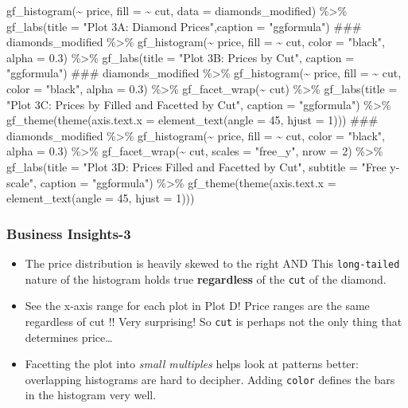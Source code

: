 \documentclass[
  letterpaper,
  DIV=11,
  numbers=noendperiod,
  oneside]{scrartcl}
\newenvironment{Shaded}{\begin{snugshade}}{\end{snugshade}}
\newcommand{\NormalTok}[1]{\textcolor[rgb]{0.00,0.23,0.31}{#1}}
\providecommand{\tightlist}{%
  \setlength{\itemsep}{0pt}\setlength{\parskip}{0pt}}
\begin{document}
\begin{Shaded}
\begin{Highlighting}[]

\NormalTok{gf\_histogram(\textasciitilde{} price, fill = \textasciitilde{} cut, data = diamonds\_modified) \%\textgreater{}\%}
\NormalTok{  gf\_labs(title = "Plot 3A: Diamond Prices",caption = "ggformula") }
\NormalTok{\#\#\#}
\NormalTok{diamonds\_modified \%\textgreater{}\% }
\NormalTok{  gf\_histogram(\textasciitilde{} price, fill = \textasciitilde{} cut, color = "black", alpha = 0.3) \%\textgreater{}\%}
\NormalTok{  gf\_labs(title = "Plot 3B: Prices by Cut",}
\NormalTok{          caption = "ggformula")}
\NormalTok{\#\#\#}
\NormalTok{diamonds\_modified \%\textgreater{}\% }
\NormalTok{  gf\_histogram(\textasciitilde{} price, fill = \textasciitilde{} cut, color = "black", alpha = 0.3) \%\textgreater{}\%}
\NormalTok{  gf\_facet\_wrap(\textasciitilde{} cut) \%\textgreater{}\%}
\NormalTok{  gf\_labs(title = "Plot 3C: Prices by Filled and Facetted by Cut",}
\NormalTok{          caption = "ggformula") \%\textgreater{}\%}
\NormalTok{  gf\_theme(theme(axis.text.x = element\_text(angle = 45, hjust = 1)))}
\NormalTok{\#\#\#}
\NormalTok{diamonds\_modified \%\textgreater{}\% }
\NormalTok{  gf\_histogram(\textasciitilde{} price, fill = \textasciitilde{} cut, color = "black", alpha = 0.3) \%\textgreater{}\% }
\NormalTok{  gf\_facet\_wrap(\textasciitilde{} cut, scales = "free\_y", nrow = 2) \%\textgreater{}\%}
\NormalTok{  gf\_labs(title = "Plot 3D: Prices Filled and Facetted by Cut", }
\NormalTok{          subtitle = "Free y{-}scale",}
\NormalTok{          caption = "ggformula") \%\textgreater{}\%}
\NormalTok{  gf\_theme(theme(axis.text.x = element\_text(angle = 45, hjust = 1)))}
\end{Highlighting}
\end{Shaded}

\subsubsection{Business Insights-3}

\begin{itemize}
\tightlist
\item
  The price distribution is heavily skewed to the right AND This
  \texttt{long-tailed} nature of the histogram holds true
  \textbf{regardless} of the \texttt{cut} of the diamond.
\item
  See the x-axis range for each plot in Plot D! Price ranges are the
  same regardless of cut !! Very surprising! So \texttt{cut} is perhaps
  not the only thing that determines price\ldots{}
\item
  Facetting the plot into \emph{small multiples} helps look at patterns
  better: overlapping histograms are hard to decipher. Adding
  \texttt{color} defines the bars in the histogram very well.
\end{itemize}
\end{document}
